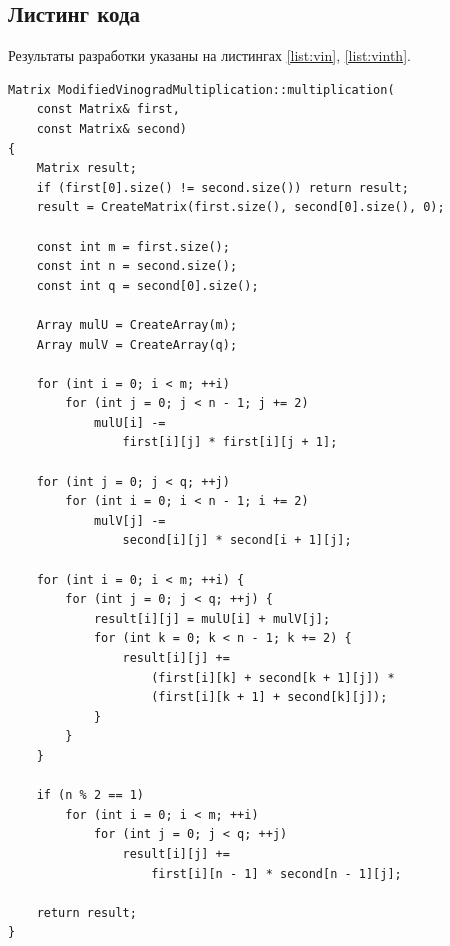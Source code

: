 \documentclass[a4paper,12pt]{article}
\begin{document}
\subsection{Листинг кода}

Результаты разработки указаны на листингах \ref{list:vin}, \ref{list:vinth}.

\begin{lstlisting}[caption=Алгоритм Винограда умножения матриц,label=list:vin]
Matrix ModifiedVinogradMultiplication::multiplication(
    const Matrix& first,
    const Matrix& second)
{
    Matrix result;
    if (first[0].size() != second.size()) return result;
    result = CreateMatrix(first.size(), second[0].size(), 0);

    const int m = first.size();
    const int n = second.size();
    const int q = second[0].size();

    Array mulU = CreateArray(m);
    Array mulV = CreateArray(q);

    for (int i = 0; i < m; ++i)
        for (int j = 0; j < n - 1; j += 2)
            mulU[i] -=
                first[i][j] * first[i][j + 1];

    for (int j = 0; j < q; ++j)
        for (int i = 0; i < n - 1; i += 2)
            mulV[j] -=
                second[i][j] * second[i + 1][j];

    for (int i = 0; i < m; ++i) {
        for (int j = 0; j < q; ++j) {
            result[i][j] = mulU[i] + mulV[j];
            for (int k = 0; k < n - 1; k += 2) {
                result[i][j] +=
                    (first[i][k] + second[k + 1][j]) *
                    (first[i][k + 1] + second[k][j]);
            }
        }
    }

    if (n % 2 == 1)
        for (int i = 0; i < m; ++i)
            for (int j = 0; j < q; ++j)
                result[i][j] +=
                    first[i][n - 1] * second[n - 1][j];

    return result;
}
\end{lstlisting}
\end{document}
